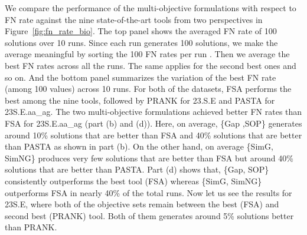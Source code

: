 

We compare the performance of the multi-objective formulations with respect to FN rate against the nine state-of-the-art tools from two perspectives in Figure~\ref{fig:fn_rate_bio}. The top panel shows the averaged FN rate of 100 solutions over 10 runs. Since each run generates 100 solutions, we make the average meaningful by sorting the 100 FN rates per run . Then we average the best FN rates across all the runs. The same applies for the second best ones and so on. And the bottom panel summarizes the variation of the best FN rate (among 100 values) across 10 runs. For both of the datasets, FSA performs the best among the nine tools, followed by PRANK for 23.S.E and PASTA for 23S.E.aa\_ag. The two multi-objective formulations achieved better FN rates than FSA for 23S.E.aa\_ag (part (b) and (d)). Here, on average, \{Gap ,SOP\} generates around 10\% solutions that are better than FSA and 40\% solutions that are better than PASTA as shown in part (b). On the other hand, on average \{SimG, SimNG\} produces very few solutions that are better than FSA but around 40\% solutions that are better than PASTA. Part (d) shows that, \{Gap, SOP\} consistently outperforms the best tool (FSA) whereas \{SimG, SimNG\} outperforms FSA in nearly 40\% of the total runs. Now let us see the results for 23S.E, where both of the objective sets remain between the best (FSA) and second best (PRANK) tool. Both of them generates around 5\% solutions better than PRANK.

